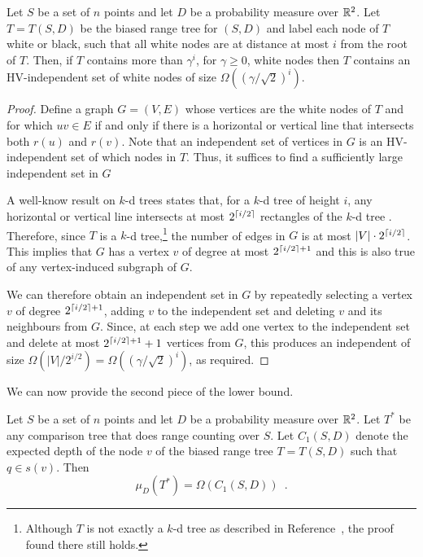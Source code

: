 \documentclass[charterfonts]{patmorin}
\begin{document}
\begin{lem}
Let $S$ be a set of $n$ points and let $D$ be a probability measure
over $\mathbb{R}^2$.
Let $T=T(S,D)$ be the biased range tree for $(S,D)$ and label
each node of $T$ white
or black, such that all white nodes are at distance at most $i$ from
the root of $T$.  Then, if $T$ contains more than $\gamma^i$, for
$\gamma\ge 0$, white nodes
then $T$ contains an HV-independent set of white nodes of size
$\Omega((\gamma/\sqrt{2})^i)$.
\end{lem}

\begin{proof}
Define a graph $G=(V,E)$ whose vertices are the white nodes of $T$ and
for which $uv\in E$ if and only if there is a horizontal or vertical line that
intersects both $r(u)$ and $r(v)$.  Note that an independent set of
vertices in $G$ is an HV-independent set of which nodes in $T$.  Thus,
it suffices to find a sufficiently large independent set in $G$

A well-know result on $k$-d trees states that, for a $k$-d tree of
height $i$, any horizontal or vertical line intersects at most
$2^{\left\lceil i/2 \right\rceil}$ rectangles of the $k$-d tree
\cite[Lemma~5.4]{bkos97}.  Therefore, since $T$ is a $k$-d
tree,\footnote{Although $T$ is not exactly a $k$-d tree as described
in Reference~\cite{bkos97}, the proof found there still holds.} the
number of edges in $G$ is at most $|V|\cdot 2^{\left\lceil i/2 \right\rceil}$.  This
implies that $G$ has a vertex $v$ of degree at most $2^{\left\lceil i/2 \right\rceil+1}$
and this is also true of any vertex-induced subgraph of $G$.

We can therefore obtain an independent set in $G$ by repeatedly
selecting a vertex $v$ of degree $2^{\left\lceil i/2 \right\rceil+1}$, adding $v$ to the
independent set and deleting $v$ and its neighbours from $G$.  Since, at
each step we add one vertex to the independent set and delete at most
$2^{\left\lceil i/2 \right\rceil+1}+1$ vertices from $G$, this produces an independent of size
$\Omega(|V|/2^{i/2}) = \Omega((\gamma/\sqrt{2})^i)$, as required.
\end{proof}

We can now provide the second piece of the lower bound.

\begin{lem}
Let $S$ be a set of $n$ points and let $D$ be a probability measure
over $\mathbb{R}^2$.
Let $T^*$ be any comparison tree that does range counting over $S$. Let
$C_1(S,D)$ denote the expected depth of the node $v$ of the biased
range tree $T=T(S,D)$ such that $q\in s(v)$.  Then
\[
    \mu_D(T^*) = \Omega(C_1(S,D)) \enspace .
\]
\end{lem}
\end{document}
